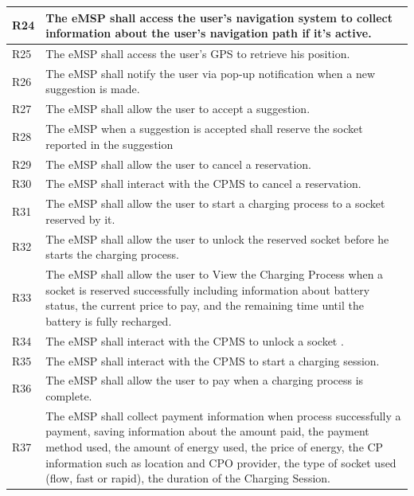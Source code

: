 \documentclass{Configuration_Files/PoliMi3i_thesis}
\begin{document}
\begin{xltabular}{\textwidth}{| >{}l | X |}
R24  &
    The eMSP shall access the user’s navigation system to collect information about the user’s navigation path if it's active.\B\\
\hline

R25  &
    The eMSP shall access the user’s GPS to retrieve his position.\B\\
\hline

R26  &
    The eMSP shall notify the user via pop-up notification when a new suggestion is made.\B\\
\hline

R27  &
    The eMSP shall allow the user to accept a suggestion.\B\\
\hline

R28  &
    The eMSP when a suggestion is accepted shall reserve the socket reported in the suggestion\B\\
\hline

R29  &
     The eMSP shall allow the user to cancel a reservation.\B\\
\hline

R30  &
    The eMSP shall interact with the CPMS to cancel a reservation.\B\\
\hline


R31  &
    The eMSP shall allow the user to start a charging process to a socket reserved by it.\B\\
\hline

R32  &
   The eMSP shall allow the user to unlock the reserved socket before he starts the charging process.\B\\
\hline

R33  &
    The eMSP shall allow the user to View  the Charging Process when a socket is reserved successfully including information about battery status, the current price to pay, and the remaining time until the battery is fully recharged.\B\\
\hline

R34  &
    The eMSP shall interact with the CPMS to unlock a socket .\B\\
\hline

R35  &
    The eMSP shall interact with the CPMS to start a charging session.\B\\
\hline

R36  &
    The eMSP shall allow the user to pay when a charging process is complete.\B\\
\hline

R37  &
    The eMSP shall collect payment information when process successfully a payment, saving information about the amount paid, the payment method used, the amount of energy used, the price of energy,  the CP information such as location and CPO provider, the type of socket used (flow, fast or rapid), the duration of the Charging Session.\B\\
\hline


\end{xltabular}
\end{document}
